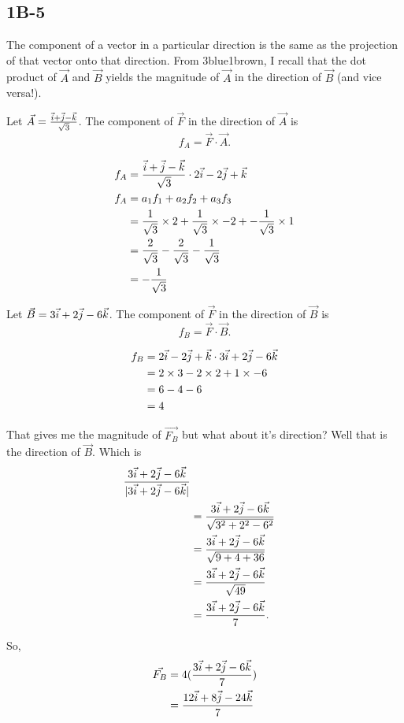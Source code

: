 \documentclass[main.tex]{subfiles}
\begin{document}
\subsection*{1B-5}


The component of a vector in a particular direction is the same as the 
projection of that vector onto that direction. From 3blue1brown, I recall
that the dot product of $\vec{A}$ and $\vec{B}$ yields the magnitude of 
$\vec{A}$ in the direction of $\vec{B}$ (and vice versa!).

Let $\vec{A} = \frac{\vec{i} + \vec{j} - \vec{k}}{\sqrt{3}}$. The component of $\vec{F}$ in
the direction of $\vec{A}$ is \[f_A = \vec{F}\cdot\vec{A}.\]

\begin{align*}
f_A &= \frac{\vec{i} + \vec{j} - \vec{k}}{\sqrt{3}} \cdot 2\vec{i} - 2\vec{j} + \vec{k}\\
f_A &= a_1 f_1 + a_2 f_2 + a_3 f_3\\
&= \frac{1}{\sqrt{3}}\times 2 
   + \frac{1}{\sqrt{3}} \times -2
   + -\frac{1}{\sqrt{3}} \times 1\\
&= \frac{2}{\sqrt{3}}
   -\frac{2}{\sqrt{3}}
   -\frac{1}{\sqrt{3}} \\
&= -\frac{1}{\sqrt{3}} \\
\end{align*}

Let $\vec{B} = 3\vec{i} + 2\vec{j} - 6\vec{k}$. The component of $\vec{F}$ in
the direction of $\vec{B}$ is \[f_B = \vec{F}\cdot\vec{B}.\]

\begin{align*}
f_B &= 2\vec{i} - 2\vec{j} + \vec{k} \cdot 3\vec{i} + 2\vec{j} - 6\vec{k}\\
    &= 2\times3 - 2\times2 + 1\times-6\\
    &= 6 - 4 - 6\\
    &= 4
\end{align*}

That gives me the magnitude of $\vec{F_B}$ but what about it's direction?
Well that is the direction of $\vec{B}$. Which is
\begin{align*}
\frac{3\vec{i} + 2\vec{j} - 6\vec{k}} {|3\vec{i} + 2\vec{j} - 6\vec{k}|}\\
&= \frac{3\vec{i} + 2\vec{j} - 6\vec{k}} {\sqrt{3^2 + 2^2 - 6^2}}\\
&= \frac{3\vec{i} + 2\vec{j} - 6\vec{k}} {\sqrt{9 + 4 + 36}}\\
&= \frac{3\vec{i} + 2\vec{j} - 6\vec{k}} {\sqrt{49}}\\
&= \frac{3\vec{i} + 2\vec{j} - 6\vec{k}} {7}.\\
\end{align*}

So, 
\begin{align*}
\vec{F_B} &= 4(\frac{3\vec{i} + 2\vec{j} - 6\vec{k}} {7})\\
 &= \frac{12\vec{i} + 8\vec{j} - 24\vec{k}} {7}\\
\end{align*}
\end{document}
